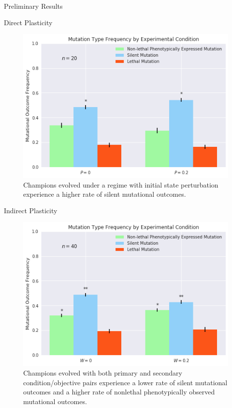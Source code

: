 \begin{block}{Preliminary Results}
\begin{alertblock}{Direct Plasticity}
\begin{figure}
    \centering
    \includegraphics[width=\textwidth]{img/mutation_type_direct}
  	\caption{Champions evolved under a regime with initial state perturbation experience a higher rate of silent mutational outcomes.}
    \label{fig:mutation_type_direct}
\end{figure}
\end{alertblock}
\begin{alertblock}{Indirect Plasticity}
\begin{figure}
    \centering
    \includegraphics[width=\textwidth]{img/mutation_type_indirect}
  	\caption{Champions evolved with both primary and secondary condition/objective pairs experience a lower rate of silent mutational outcomes and a higher rate of nonlethal phenotypically observed mutational outcomes.}
    \label{fig:mutation_type_indirect}
\end{figure}
\end{alertblock}
\end{block}
